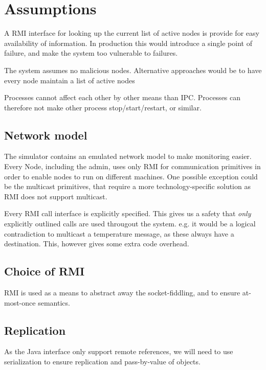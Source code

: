 \documentclass[10pt,a4paper]{article}
\begin{document}
\section{Assumptions}
A RMI interface for looking up the current list of active nodes is provide for easy availability of information. In production this would introduce a single point of failure, and make the system too vulnerable to failures.

The system assumes no malicious nodes.
Alternative approaches would be to have every node maintain a list of active nodes



Processes cannot affect each other by other means than IPC. Processes can therefore not make other process stop/start/restart, or similar.

\subsection{Network model}
The simulator contains an emulated network model to make monitoring easier. Every Node, including the admin, uses only RMI for communication primitives in order to enable nodes to run on different machines.
One possible exception could be the multicast primitives, that require a more technology-specific solution as RMI does not support multicast.

Every RMI call interface is explicitly specified. This gives us a safety that \emph{only} explicitly outlined calls are used througout the system. e.g. it would be a logical contradiction to multicast a temperature message, as these always have a destination. This, however gives some extra code overhead.

\subsection{Choice of RMI}
RMI is used as a means to abstract away the socket-fiddling, and to ensure at-most-once semantics.

\subsection{Replication}
As the Java interface  only support remote references, we will need to use serialization to ensure replication and pass-by-value of objects.
\end{document}
